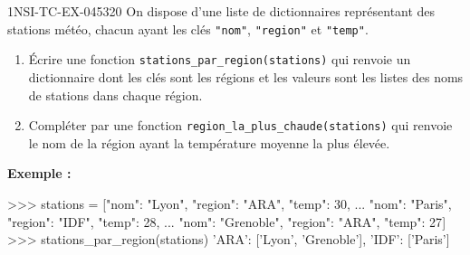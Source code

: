 \begin{exercice}{1NSI-TC-EX-045}{3}{20}
On dispose d'une liste de dictionnaires représentant des stations météo, chacun
ayant les clés \lstinline{"nom"}, \lstinline{"region"} et \lstinline{"temp"}.

\begin{enumerate}
  \item Écrire une fonction \lstinline{stations_par_region(stations)} qui renvoie un
        dictionnaire dont les clés sont les régions et les valeurs sont les listes
        des noms de stations dans chaque région.
  \item Compléter par une fonction \lstinline{region_la_plus_chaude(stations)} qui
        renvoie le nom de la région ayant la température moyenne la plus élevée.
\end{enumerate}

\textbf{Exemple :}
\begin{console}
>>> stations = [{"nom": "Lyon", "region": "ARA", "temp": 30},
...             {"nom": "Paris", "region": "IDF", "temp": 28},
...             {"nom": "Grenoble", "region": "ARA", "temp": 27}]
>>> stations_par_region(stations)
{'ARA': ['Lyon', 'Grenoble'], 'IDF': ['Paris']}
\end{console}
\end{exercice}
